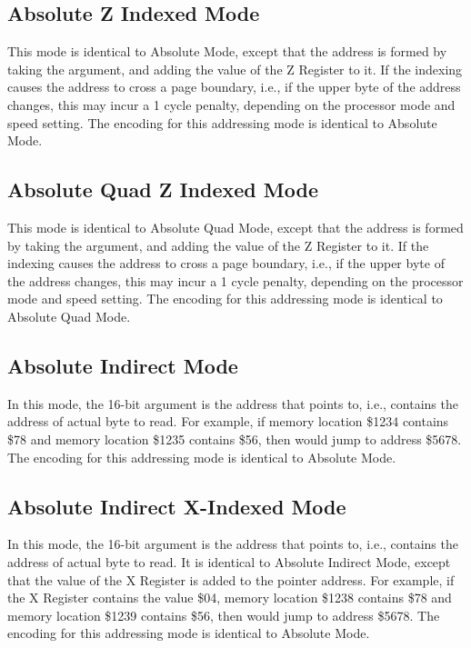 \subsection{Absolute Z Indexed Mode}

This mode is identical to Absolute Mode, except that the address is formed by taking the
argument, and adding the value of the Z Register to it.  If the indexing causes the address
to cross a page boundary, i.e., if the upper byte of the address changes, this may incur a
1 cycle penalty, depending on the processor mode and speed setting.
The encoding for this addressing mode is identical to Absolute Mode.

\subsection{Absolute Quad Z Indexed Mode}

This mode is identical to Absolute Quad Mode, except that the address is formed by taking the
argument, and adding the value of the Z Register to it.  If the indexing causes the address
to cross a page boundary, i.e., if the upper byte of the address changes, this may incur a
1 cycle penalty, depending on the processor mode and speed setting.
The encoding for this addressing mode is identical to Absolute Quad Mode.

\subsection{Absolute Indirect Mode}

In this mode, the 16-bit argument is the address that points to, i.e., contains the
address of actual byte to read.  For example, if memory location \$1234 contains \$78
and memory location \$1235 contains \$56, then  would jump
to address \$5678.  The encoding for this addressing mode is identical to Absolute Mode.

\subsection{Absolute Indirect X-Indexed Mode}

In this mode, the 16-bit argument is the address that points to, i.e., contains the
address of actual byte to read. It is identical to Absolute Indirect Mode, except that
 the value of the X Register is added to the pointer address.
For example, if the X Register contains the value \$04, memory location \$1238 contains \$78
and memory location \$1239 contains \$56, then  would jump
to address \$5678.
The encoding for this addressing mode is identical to Absolute Mode.

